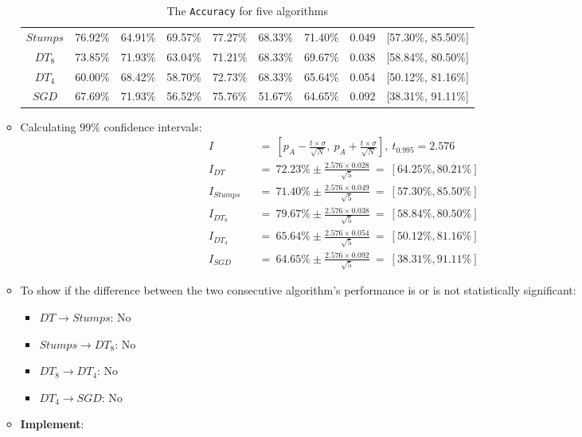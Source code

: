 \begin{enumerate}
\begin{itemize}
\begin{table}[h]
\begin{tabular}[h]{|c|c|c|c|c|c|c|c|c|}
					$Stumps$  & 76.92\%    & 64.91\%    & 69.57\%    & 77.27\%    & 68.33\%    & 71.40\%    & 0.049    & [57.30\%, 85.50\%]\\
					$DT_8$    & 73.85\%    & 71.93\%    & 63.04\%    & 71.21\%    & 68.33\%    & 69.67\%    & 0.038    & [58.84\%, 80.50\%]\\
					$DT_4$    & 60.00\%    & 68.42\%    & 58.70\%    & 72.73\%    & 68.33\%    & 65.64\%    & 0.054    & [50.12\%, 81.16\%]\\
					$SGD$     & 67.69\%    & 71.93\%    & 56.52\%    & 75.76\%    & 51.67\%    & 64.65\%    & 0.092    & [38.31\%, 91.11\%]\\
					\hline
				\end{tabular}
				\caption{The {\tt Accuracy} for five algorithms}
				\label{tab:Balloons}
			\end{table}
		\item Calculating $99\%$ confidence intervals:\\
			\begin{eqnarray}
			I && = \: [p_A - \frac{t \times \sigma}{\sqrt{N}}, \: p_A + \frac{t \times \sigma}{\sqrt{N}}], \: t_{0.995} = 2.576\\
			I_{DT} && = \: 72.23\% \pm \frac{2.576 \times 0.028}{\sqrt{5}} \: = \: [64.25\%, 80.21\%] \\
			I_{Stumps} && = \: 71.40\% \pm \frac{2.576 \times 0.049}{\sqrt{5}} \: = \: [57.30\%, 85.50\%] \\
			I_{DT_8} && = \: 79.67\% \pm \frac{2.576 \times 0.038}{\sqrt{5}} \: = \: [58.84\%, 80.50\%] \\
			I_{DT_4} && = \: 65.64\% \pm \frac{2.576 \times 0.054}{\sqrt{5}} \: = \: [50.12\%, 81.16\%] \\
			I_{SGD} && = \: 64.65\% \pm \frac{2.576 \times 0.092}{\sqrt{5}} \: = \: [38.31\%, 91.11\%]
			\end{eqnarray}
		\item To show if the difference between the two consecutive algorithm's performance is or is not statistically significant:
			\begin{itemize}
			\item $DT \rightarrow Stumps$: No
			\item $Stumps \rightarrow DT_8$: No 
			\item $DT_8 \rightarrow DT_4$: No
			\item $DT_4 \rightarrow SGD$: No \\
			\end{itemize}
		\item \textbf{Implement}:

\end{itemize}
\end{enumerate}
